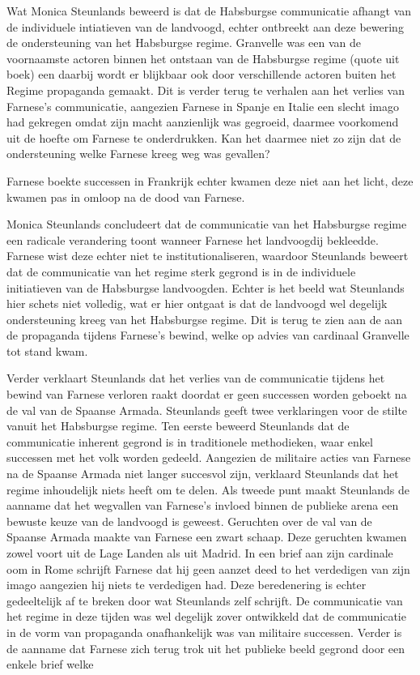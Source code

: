 \documentclass[11pt]{amsart}
\begin{document}
Wat Monica Steunlands beweerd is dat de Habsburgse communicatie afhangt van de individuele intiatieven van de
landvoogd, echter ontbreekt aan deze bewering de ondersteuning van het Habsburgse regime. Granvelle was een van de
voornaamste actoren binnen het ontstaan van de Habsburgse regime (quote uit boek) een daarbij wordt er blijkbaar ook
door verschillende actoren buiten het Regime propaganda gemaakt. Dit is verder terug te verhalen aan het verlies van
Farnese's communicatie, aangezien Farnese in Spanje en Italie een slecht imago had gekregen omdat zijn macht
aanzienlijk was gegroeid, daarmee voorkomend uit de hoefte om Farnese te onderdrukken. Kan het daarmee niet zo zijn dat
de ondersteuning welke Farnese kreeg weg was gevallen?

Farnese boekte successen in Frankrijk echter kwamen deze niet aan het licht, deze kwamen pas in omloop na de dood van
Farnese.

Monica Steunlands concludeert dat de communicatie van het Habsburgse regime een radicale verandering toont wanneer
Farnese het landvoogdij bekleedde. Farnese wist deze echter niet te institutionaliseren, waardoor Steunlands beweert
dat de communicatie van het regime sterk gegrond is in de individuele initiatieven van de Habsburgse landvoogden.
Echter is het beeld wat Steunlands hier schets niet volledig, wat er hier ontgaat is dat de landvoogd wel degelijk
ondersteuning kreeg van het Habsburgse regime. Dit is terug te zien aan de aan de propaganda tijdens Farnese's bewind,
welke op advies van cardinaal Granvelle tot stand kwam.

Verder verklaart Steunlands dat het verlies van de communicatie tijdens het bewind van Farnese verloren raakt doordat
er geen successen worden geboekt na de val van de Spaanse Armada. Steunlands geeft twee verklaringen voor de stilte
vanuit het Habsburgse regime. Ten eerste beweerd Steunlands dat de communicatie inherent gegrond is in traditionele
methodieken, waar enkel successen met het volk worden gedeeld. Aangezien de militaire acties van Farnese na de Spaanse
Armada niet langer succesvol zijn, verklaard Steunlands dat het regime inhoudelijk niets heeft om te delen. Als tweede
punt maakt Steunlands de aanname dat het wegvallen van Farnese's invloed binnen de publieke arena een bewuste keuze van
de landvoogd is geweest. Geruchten over de val van de Spaanse Armada maakte van Farnese een zwart schaap. Deze
geruchten kwamen zowel voort uit de Lage Landen als uit Madrid. In een brief aan zijn cardinale oom in Rome schrijft
Farnese dat hij geen aanzet deed to het verdedigen van zijn imago aangezien hij niets te verdedigen had. Deze
beredenering is echter gedeeltelijk af te breken door wat Steunlands zelf schrijft. De communicatie van het regime in
deze tijden was wel degelijk zover ontwikkeld dat de communicatie in de vorm van propaganda onafhankelijk was van
militaire successen. Verder is de aanname dat Farnese zich terug trok uit het publieke beeld gegrond door een enkele
brief welke
\end{document}
